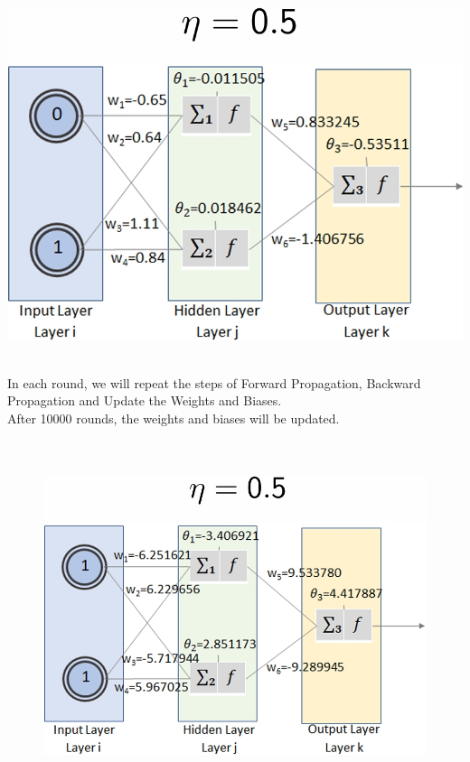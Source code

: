 \documentclass{book}
\begin{document}
\begin{center}
    \includegraphics[scale=0.2]{chapter 7/ch7_figure10.jpeg}
\end{center}
\newpage
{}\\
In each round, we will repeat the steps of Forward Propagation, Backward Propagation and Update the Weights and Biases.\\
After 10000 rounds, the weights and biases will be updated.\\
\vspace{3mm}
\\
\\
\begin{figure}
    \includegraphics[scale=0.2]{chapter 7/ch7_figure11.jpeg}
\end{figure}
\end{document}
